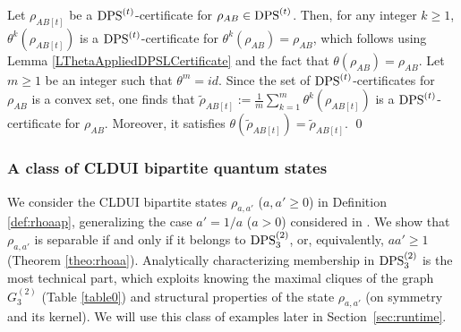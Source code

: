 \documentclass[11pt]{article}
\makeatletter
\newcommand{\DPS}{\text{\rm DPS}}
\theoremstyle{plain}
\renewenvironment{proof}[1][\proofname]{%
  \par
  \pushQED{}%
  \normalfont
  \topsep6\p@\@plus6\p@
  \trivlist
  \item[\hskip\labelsep\itshape #1\@addpunct{.}]%
}{%
  \popQED
  \endtrivlist
}
\makeatother
\begin{document}
\begin{proof}
Let $\rho_{AB[t]}$ be a $\DPS^{(t)}$-certificate for  $\rho_{AB}\in\DPS^{(t)}$. 
 Then, for any integer $k\ge 1$, $\theta^k(\rho_{AB[t]})$ is a $\DPS^{(t)}$-certificate for $\theta^k(\rho_{AB})=\rho_{AB}$, which follows using Lemma \ref{LThetaAppliedDPSLCertificate} and the fact that $\theta(\rho_{AB})=\rho_{AB}$. Let $m\ge 1$ be an integer such that $\theta^m=id$. Since the set of $\DPS^{(t)}$-certificates for   $\rho_{AB}$ is a convex set,
 one finds that  
    $\widetilde\rho_{AB[t]}:=\frac{1}{m}\sum_{k=1}^m\theta^k(\rho_{AB[t]})$
is a $\DPS^{(t)}$-certificate for $\rho_{AB}$. Moreover, it satisfies 
$\theta(\widetilde\rho_{AB[t]})= \widetilde\rho_{AB[t]}$.
%
\qed\end{proof}

\subsubsection*{A class of CLDUI bipartite quantum states}\label{sec:example}

We  consider the   CLDUI bipartite states $\rho_{a,a'}$ ($a,a'\ge 0$) in Definition \ref{def:rhoaap},   generalizing  the case  $a'=1/a$ ($a>0$) considered in  \cite[Example 3.3]{JML-PCP}.
We  show 
 that $\rho_{a,a'}$ is separable if and only if it belongs to $\DPS^{(2)}_3$,  or, equivalently,  $aa'\ge 1$   (Theorem \ref{theo:rhoaa}). Analytically characterizing membership in $\DPS^{(2)}_3$ is the most technical part, 
 which exploits knowing the maximal cliques of the graph $G^{(2)}_3$ (Table \ref{table0}) and  structural properties of the state $\rho_{a,a'}$ (on symmetry and  its kernel).
We will use this class of examples later in Section~\ref{sec:runtime}.
\end{document}
